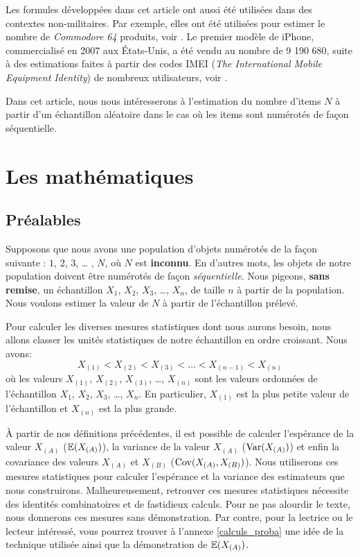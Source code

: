 \documentclass[10pt]{article}
\begin{document}
Les formules développées dans cet article ont aussi été utilisées dans
des contextes non-militaires. Par exemple, elles ont été utilisées pour
estimer le nombre de \emph{Commodore 64} produits, voir
\cite{commodore64}. Le premier modèle de iPhone, commercialisé en 2007
aux États-Unis, a été vendu au nombre de 9 190 680, suite à des
estimations faites à partir des codes IMEI (\emph{The International
Mobile Equipment Identity}) de nombreux utilisateurs, voir
\cite{iphone}.

Dans cet article, nous nous intéresserons à l'estimation du nombre
d'items \(N\) à partir d'un échantillon aléatoire dans le cas où les
items sont numérotés de façon séquentielle.

\hypertarget{les-mathematiques}{%
\section{\texorpdfstring{Les mathématiques
\label{maths}}{Les mathématiques }}\label{les-mathematiques}}

\hypertarget{prealables}{%
\subsection{Préalables}\label{prealables}}

Supposons que nous avons une population d'objets numérotés de la façon
suivante : \(1\), \(2\), \(3\), \ldots{} , \(N\), où \(N\) est
\textbf{inconnu}. En d'autres mots, les objets de notre population
doivent être numérotés de façon \emph{séquentielle}. Nous pigeons,
\textbf{sans remise}, un échantillon \(X_1\), \(X_2\), \(X_3\),
\ldots{}, \(X_n\), de taille \(n\) à partir de la population. Nous
voulons estimer la valeur de \(N\) à partir de l'échantillon prélevé.

Pour calculer les diverses mesures statistiques dont nous aurons besoin,
nous allons classer les unités statistiques de notre échantillon en
ordre croissant. Nous avons:
\[X_{(1)} <  X_{(2)} < X_{(3)} < \ldots < X_{(n-1)} < X_{(n)}\] où les
valeurs \(X_{(1)}\), \(X_{(2)}\), \(X_{(3)}\), \ldots{}, \(X_{(n)}\)
sont les valeurs ordonnées de l'échantillon \(X_1\), \(X_2\), \(X_3\),
\ldots{}, \(X_n\). En particulier, \(X_{(1)}\) est la plus petite valeur
de l'échantillon et \(X_{(n)}\) est la plus grande.

À partir de nos définitions précédentes, il est possible de calculer
l'espérance de la valeur \(X_{(A)}\) (\(\operatorname{\mathbb{E}} (X_{(A)})\)), la variance
de la valeur \(X_{(A)}\) (\(\operatorname{Var}(X_{(A)})\)) et enfin la covariance des
valeurs \(X_{(A)}\) et \(X_{(B)}\) (\(\operatorname{Cov}(X_{(A)},X_{(B)})\)). Nous
utiliserons ces mesures statistiques pour calculer l'espérance et la
variance des estimateurs que nous construirons. Malheureusement,
retrouver ces mesures statistiques nécessite des identités combinatoires
et de fastidieux calculs. Pour ne pas alourdir le texte, nous donnerons
ces mesures sans démonstration. Par contre, pour la lectrice ou le
lecteur intéressé, vous pourrez trouver à l'annexe \ref{calculs_proba}
une idée de la technique utilisée ainsi que la démonstration de
\(\operatorname{\mathbb{E}}(X_{(A)})\).
\end{document}
